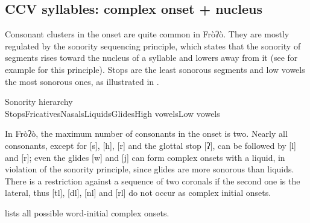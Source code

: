 \documentclass[output=paper]{langscibook}
\begin{document}
\subsection{ CCV syllables: complex onset + nucleus}
\label{sec:ccvsyllable:2c}

Consonant clusters in the onset are quite common in Fròʔò. They are mostly regulated by the sonority sequencing principle, which states that the sonority of segments rises toward the nucleus of a syllable and lowers away from it (see for example \citealt{Clements1990} for this principle). Stops are the least sonorous segments and low vowels the most sonorous ones, as illustrated in .

\begin{exe}
    \ex Sonority hierarchy \label{ex:traore:sonorityHierarchy:11}\\
    Stops\hspace{.3cm}Fricatives\hspace{.3cm}Nasals\hspace{.3cm}Liquids\hspace{.3cm}Glides\hspace{.3cm}High vowels\hspace{.3cm}Low vowels\\
\end{exe}

In Fròʔò, the maximum number of consonants in the onset is two. Nearly all consonants, except for [s], [h], [r] and the glottal stop [ʔ], can be followed by [l] and [r]; even the glides [w] and [j] can form complex onsets with a liquid, in violation of the sonority principle, since glides are more sonorous than liquids. There is a restriction against a sequence of two coronals if the second one is the lateral, thus [tl], [dl], [nl] and [rl] do not occur as complex initial onsets.

 lists all possible word-initial complex onsets. 
\end{document}
